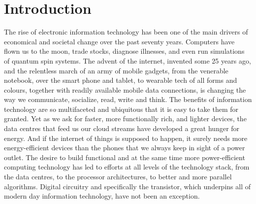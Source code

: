 \chapter{Introduction}

The rise of electronic information technology has been one of the main drivers
of economical and societal change over the past seventy years. Computers have
flown us to the moon, trade stocks, diagnose illnesses, and even run simulations
of quantum spin systems. The advent of the internet, invented some 25 years ago,
and the relentless march of an army of mobile gadgets, from the venerable
notebook, over the smart phone and tablet, to wearable tech of all forms and
colours, together with readily available mobile data connections, is changing
the way we communicate, socialize, read, write and think. The benefits of
information technology are so multifaceted and ubiquitous that it is easy to
take them for granted. Yet as we ask for faster, more functionally rich, and
lighter devices, the data centres that feed us our cloud streams have developed
a great hunger for energy. And if the internet of things is supposed to happen,
it surely needs more energy-efficient devices than the phones that we always
keep in sight of a power outlet. The desire to build functional and at the same
time more power-efficient computing technology has led to efforts at all levels
of the technology stack, from the data centres, to the processor architectures,
to better and more parallel algorithms. Digital circuitry and specifically the
transistor, which underpins all of modern day information technology, have not
been an exception.


